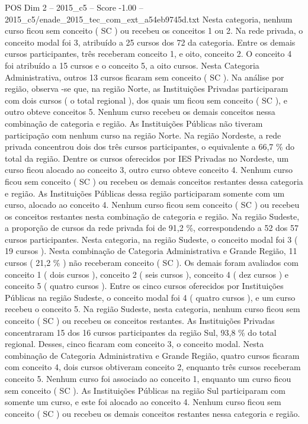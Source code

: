 \begin{textsample}{POS Dim 2 – 2015\_c5 – Score -1.00 – 2015\_c5/enade\_2015\_tec\_com\_ext\_a54eb9745d.txt}
Nesta categoria, nenhum curso ficou sem conceito ( SC ) ou recebeu os conceitos 1 ou 2.
Na rede privada, o conceito modal foi 3, atribuído a 25 cursos dos 72 da categoria.
Entre os demais cursos participantes, três receberam conceito 1, e oito, conceito 2.
O conceito 4 foi atribuído a 15 cursos e o conceito 5, a oito cursos.
Nesta Categoria Administrativa, outros 13 cursos ficaram sem conceito ( SC ).
Na análise por região, observa -se que, na região Norte, as Instituições Privadas participaram com dois cursos ( o total regional ), dos quais um ficou sem conceito ( SC ), e outro obteve conceitos 5.
Nenhum curso recebeu os demais conceitos nessa combinação de categoria e região.
As Instituições Públicas não tiveram participação com nenhum curso na região Norte.
Na região Nordeste, a rede privada concentrou dois dos três cursos participantes, o equivalente a 66,7 \% do total da região.
Dentre os cursos oferecidos por IES Privadas no Nordeste, um curso ficou alocado ao conceito 3, outro curso obteve conceito 4.
Nenhum curso ficou sem conceito ( SC ) ou recebeu os demais conceitos restantes dessa categoria e região.
As Instituições Públicas dessa região participaram somente com um curso, alocado ao conceito 4.
Nenhum curso ficou sem conceito ( SC ) ou recebeu os conceitos restantes nesta combinação de categoria e região.
Na região Sudeste, a proporção de cursos da rede privada foi de 91,2 \%, correspondendo a 52 dos 57 cursos participantes.
Nesta categoria, na região Sudeste, o conceito modal foi 3 ( 19 cursos ).
Nesta combinação de Categoria Administrativa e Grande Região, 11 cursos ( 21,2 \% ) não receberam conceito ( SC ).
Os demais foram avaliados com conceito 1 ( dois cursos ), conceito 2 ( seis cursos ), conceito 4 ( dez cursos ) e conceito 5 ( quatro cursos ).
Entre os cinco cursos oferecidos por Instituições Públicas na região Sudeste, o conceito modal foi 4 ( quatro cursos ), e um curso recebeu o conceito 5.
Na região Sudeste, nesta categoria, nenhum curso ficou sem conceito ( SC ) ou recebeu os conceitos restantes.
As Instituições Privadas concentraram 15 dos 16 cursos participantes da região Sul, 93,8 \% do total regional.
Desses, cinco ficaram com conceito 3, o conceito modal.
Nesta combinação de Categoria Administrativa e Grande Região, quatro cursos ficaram com conceito 4, dois cursos obtiveram conceito 2, enquanto três cursos receberam conceito 5.
Nenhum curso foi associado ao conceito 1, enquanto um curso ficou sem conceito ( SC ).
As Instituições Públicas na região Sul participaram com somente um curso, e este foi alocado ao conceito 4.
Nenhum curso ficou sem conceito ( SC ) ou recebeu os demais conceitos restantes nessa categoria e região.

\end{textsample}

